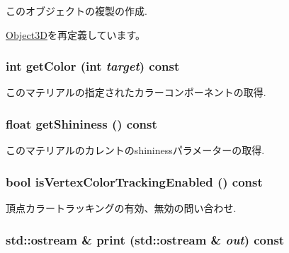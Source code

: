 このオブジェクトの複製の作成. 

\hyperlink{classm3g_1_1Object3D_a25110dac934f867b83b73ad4741a0f4}{Object3D}を再定義しています。\hypertarget{classm3g_1_1Material_d5740043584c6bf87bf014402c5985be}{
\subsubsection[{getColor}]{\setlength{\rightskip}{0pt plus 5cm}int getColor (int {\em target}) const}}
\label{classm3g_1_1Material_d5740043584c6bf87bf014402c5985be}


このマテリアルの指定されたカラーコンポーネントの取得. \hypertarget{classm3g_1_1Material_1bab082fe3510dbe7b98dd07b3976b5b}{
\subsubsection[{getShininess}]{\setlength{\rightskip}{0pt plus 5cm}float getShininess () const}}
\label{classm3g_1_1Material_1bab082fe3510dbe7b98dd07b3976b5b}


このマテリアルのカレントのshininessパラメーターの取得. \hypertarget{classm3g_1_1Material_64fb5d60325fd073ab623d0eb04189d1}{
\subsubsection[{isVertexColorTrackingEnabled}]{\setlength{\rightskip}{0pt plus 5cm}bool isVertexColorTrackingEnabled () const}}
\label{classm3g_1_1Material_64fb5d60325fd073ab623d0eb04189d1}


頂点カラートラッキングの有効、無効の問い合わせ. \hypertarget{classm3g_1_1Material_6fea17fa1532df3794f8cb39cb4f911f}{
\subsubsection[{print}]{\setlength{\rightskip}{0pt plus 5cm}std::ostream \& print (std::ostream \& {\em out}) const}}
\label{classm3g_1_1Material_6fea17fa1532df3794f8cb39cb4f911f}


